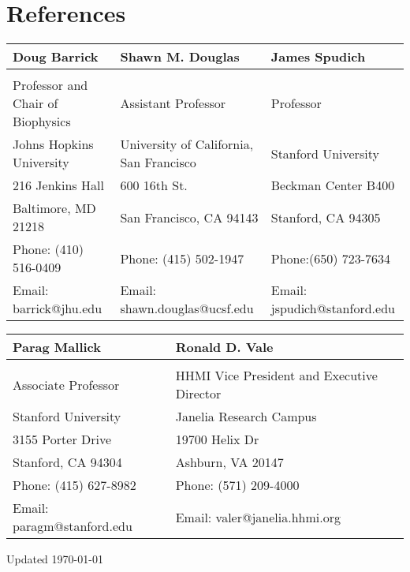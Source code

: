 \documentclass[12pt,letterpaper]{report}
\begin{document}
    \section*{References}

    \begin{tabular}{lll}
        Doug Barrick&  Shawn M. Douglas & James Spudich \\
        \hline \\
        Professor and Chair of Biophysics  & Assistant Professor & Professor \\
        Johns Hopkins University  & University of California, San Francisco & Stanford University \\
        216 Jenkins Hall  & 600 16th St. & Beckman Center B400 \\
        Baltimore, MD 21218  & San Francisco, CA 94143 & Stanford, CA 94305 \\
        Phone: (410) 516-0409 & Phone: (415) 502-1947 & Phone:(650) 723-7634\\
        Email: barrick@jhu.edu  & Email: shawn.douglas@ucsf.edu & Email: jspudich@stanford.edu

    \end{tabular}

    \vspace{3em}

    \begin{tabular}{ll}
        Parag Mallick & Ronald D. Vale \\
        \hline \\
        Associate Professor &  HHMI Vice President and Executive Director \\
        Stanford University & Janelia Research Campus \\
        3155 Porter Drive & 19700 Helix Dr \\
        Stanford, CA 94304 & Ashburn, VA 20147 \\
        Phone: (415) 627-8982 & Phone: (571) 209-4000\\
        Email: paragm@stanford.edu & Email: valer@janelia.hhmi.org
    \end{tabular}

    \begin{center}
        \vfill
        Updated \monthyeardate\today
    \end{center}
\end{document}
